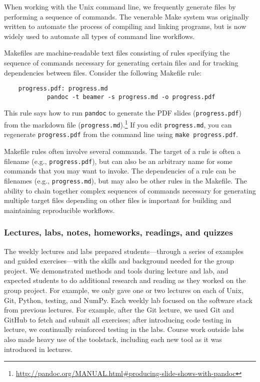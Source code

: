 When working with the Unix command line, we frequently generate files
by performing a sequence of commands.
The venerable Make system was originally written to automate the process
of compiling and linking programs, but is now widely used to
automate all types of command line workflows.

Makefiles are machine-readable text files consisting of rules
specifying the sequence of commands necessary for generating
certain files and for tracking dependencies between files.
Consider the following Makefile rule:
\begin{verbatim}
    progress.pdf: progress.md
            pandoc -t beamer -s progress.md -o progress.pdf
\end{verbatim}
This rule says how to run \texttt{pandoc} to generate the PDF slides (\texttt{progress.pdf}) from the
markdown file (\texttt{progress.md}).\footnote{\url{http://pandoc.org/MANUAL.html\#producing-slide-shows-with-pandoc}}
If you edit \texttt{progress.md}, you can regenerate \texttt{progress.pdf}
from the command line using \texttt{make progress.pdf}.

Makefile rules often involve several commands.
The target of a rule is often a filename (e.g., \texttt{progress.pdf}), but can
also be an arbitrary name for some commands that you may want to invoke.
The dependencies of a rule can be filenames (e.g., \texttt{progress.md}), but
may also be other rules in the Makefile.
The ability to chain together complex sequences of commands necessary for
generating multiple target files depending on other files is important for
building and maintaining reproducible workflows.

\subsubsection{Lectures, labs, notes, homeworks, readings, and quizzes}

The weekly lectures and labs prepared students---through a
series of examples and guided exercises---with the skills and
background needed for the group project.
We demonstrated methods and tools during lecture and lab,
and expected students to do additional research and reading as they worked on
the group project.
For example, we only gave one or two lectures on each of Unix, Git, Python,
testing, and NumPy.
Each weekly lab focused on the software stack from previous lectures.
For example, after the Git lecture, we used Git and GitHub to fetch and submit
all exercises;
after introducing code testing in lecture, we continually reinforced testing in
the labs.
Course work outside labs also made heavy use of the toolstack, including each
new tool as it was introduced in lectures.

